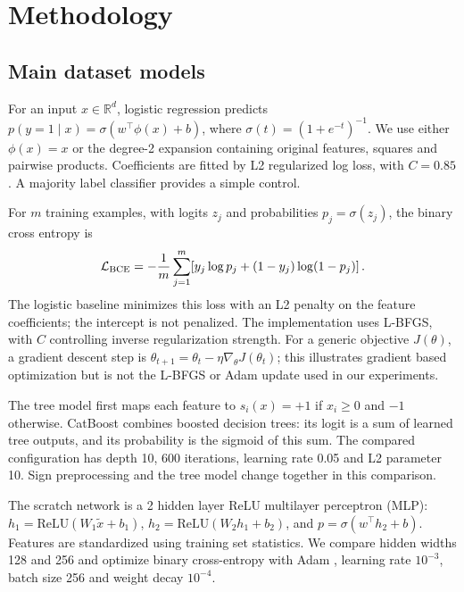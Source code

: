 \documentclass{article}
\begin{document}
\section{Methodology}
\subsection{Main dataset models}
For an input $x\in\mathbb R^d$, logistic regression predicts $p(y=1\mid x)=\sigma(w^\top\phi(x)+b)$, where $\sigma(t)=(1+e^{-t})^{-1}$. We use either $\phi(x)=x$ or the degree-2 expansion containing original features, squares and pairwise products. Coefficients are fitted by L2 regularized log loss, with $C=0.85$. A majority label classifier provides a simple control.

For $m$ training examples, with logits $z_j$ and probabilities $p_j=\sigma(z_j)$, the binary cross entropy is
\begin{equation}
\mathcal L_{\rm BCE}=-\frac1m\sum_{j=1}^{m}\!\left[y_j\log p_j+(1-y_j)\log(1-p_j)\right].
\end{equation}
The logistic baseline minimizes this loss with an L2 penalty on the feature coefficients; the intercept is not penalized. The implementation uses L-BFGS, with $C$ controlling inverse regularization strength. For a generic objective $J(\theta)$, a gradient descent step is $\theta_{t+1}=\theta_t-\eta\nabla_\theta J(\theta_t)$; this illustrates gradient based optimization but is not the L-BFGS or Adam update used in our experiments.

The tree model first maps each feature to $s_i(x)=+1$ if $x_i\geq0$ and $-1$ otherwise. CatBoost \cite{prokhorenkova2018} combines boosted decision trees: its logit is a sum of learned tree outputs, and its probability is the sigmoid of this sum. The compared configuration has depth 10, 600 iterations, learning rate 0.05 and L2 parameter 10. Sign preprocessing and the tree model change together in this comparison.

The scratch network is a 2 hidden layer ReLU multilayer perceptron (MLP): $h_1=\mathrm{ReLU}(W_1\tilde{x}+b_1)$, $h_2=\mathrm{ReLU}(W_2h_1+b_2)$, and $p=\sigma(w^\top h_2+b)$. Features are standardized using training set statistics. We compare hidden widths 128 and 256 and optimize binary cross-entropy with Adam \cite{kingma2015}, learning rate $10^{-3}$, batch size 256 and weight decay $10^{-4}$.
\end{document}
